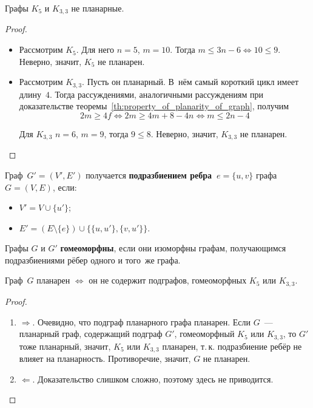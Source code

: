 \begin{theorem}
Графы $K_5$ и $K_{3,3}$ не планарные.
\end{theorem}
\begin{proof}
\begin{itemize}
	\item Рассмотрим $K_5$.
	Для него $n = 5$, $m = 10$.
	Тогда $m \leqslant 3n - 6 \Leftrightarrow 10 \leqslant 9$.	
	Неверно, значит, $K_5$ не планарен.
	\item Рассмотрим $K_{3,3}$.
	Пусть он планарный.
	В~нём самый короткий цикл имеет длину~$4$.
	Тогда рассуждениями, аналогичными рассуждениям при доказательстве теоремы~\ref*{th:property_of_planarity_of_graph}, получим
	\begin{equation*}
	2m \geqslant 4f \Leftrightarrow 2m \geqslant 4m + 8 - 4n \Leftrightarrow m \leqslant 2n - 4
	\end{equation*}
	
	Для $K_{3,3}$ $n = 6$, $m = 9$, тогда $9 \leqslant 8$.
	Неверно, значит, $K_{3,3}$ не планарен.
\end{itemize}
\end{proof}

Граф~$G' = (V', E')$ получается \textbf{подразбиением ребра~$e = \{ u, v \}$} графа~$G = (V, E)$, если:
\begin{itemize}
	\item $V' = V \cup \{ u' \}$;
	\item $E' = (E \setminus \{ e \}) \cup \{ \{ u, u' \}, \{ v, u' \} \}$.
\end{itemize}

 Графы $G$ и $G'$ \textbf{гомеоморфны}, если они изоморфны графам, получающимся подразбиениями рёбер одного и того~же графа.

\begin{theorem}
Граф~$G$ планарен $\Leftrightarrow$ он не содержит подграфов, гомеоморфных $K_5$ или $K_{3,3}$.
\end{theorem}
\begin{proof}
\begin{enumerate}
	\item $\Rightarrow$. Очевидно, что подграф планарного графа планарен.
	Если $G$~--- планарный граф, содержащий подграф $G'$, гомеоморфный $K_5$ или $K_{3,3}$, то $G'$ тоже планарный, значит, $K_5$ или $K_{3,3}$ планарен, т.\,к. подразбиение ребёр не влияет на планарность.
	Противоречие, значит, $G$ не планарен.
	\item $\Leftarrow$. Доказательство слишком сложно, поэтому здесь не приводится.
\end{enumerate}
\end{proof}

